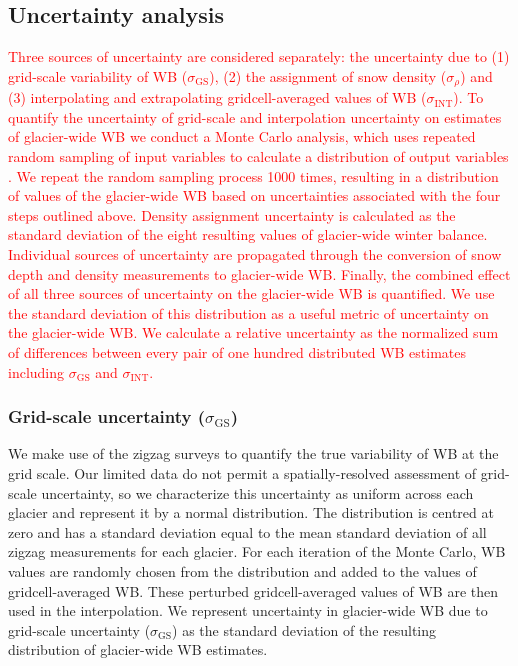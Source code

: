 \documentclass[review,oneside, letterpaper]{igs}
\begin{document}
\subsection{Uncertainty analysis}

\textcolor{red}{Three sources of uncertainty are considered separately: the uncertainty due to (1) grid-scale variability of WB ($\sigma_{\mathrm{GS}}$), (2) the assignment of snow density ($\sigma_{\rho}$) and (3) interpolating and extrapolating gridcell-averaged values of WB ($\sigma_{\mathrm{INT}}$). To quantify the uncertainty of grid-scale and interpolation uncertainty on estimates of glacier-wide WB we conduct a Monte Carlo analysis, which uses repeated random sampling of input variables to calculate a distribution of output variables \citep{Metropolis1949}. We repeat the random sampling process 1000 times, resulting in a distribution of values of the glacier-wide WB based on uncertainties associated with the four steps outlined above. Density assignment uncertainty is calculated as the standard deviation of the eight resulting values of glacier-wide winter balance. 
Individual sources of uncertainty are propagated through the conversion of snow depth and density measurements to glacier-wide WB. Finally, the combined effect of all three sources of uncertainty on the glacier-wide WB is quantified. We use the standard deviation of this distribution as a useful metric of uncertainty on the glacier-wide WB. We calculate a relative uncertainty as the normalized sum of differences between every pair of one hundred distributed WB estimates including $\sigma_{\mathrm{GS}}$ and $\sigma_{\mathrm{INT}}$.}

	\subsubsection{Grid-scale uncertainty ($\sigma_{\mathrm{GS}}$)}
We make use of the zigzag surveys to quantify the true variability of WB at the grid scale. Our limited data do not permit a spatially-resolved assessment of grid-scale uncertainty, so we characterize this uncertainty as uniform across each glacier and represent it by a normal distribution. The distribution is centred at zero and has a standard deviation equal to the mean standard deviation of all zigzag measurements for each glacier. For each iteration of the Monte Carlo, WB values are randomly chosen from the distribution and added to the values of gridcell-averaged WB. These perturbed gridcell-averaged values of WB are then used in the interpolation. We represent uncertainty in glacier-wide WB due to grid-scale uncertainty ($\sigma_{\mathrm{GS}}$) as the standard deviation of the resulting distribution of glacier-wide WB estimates.  
\end{document}
